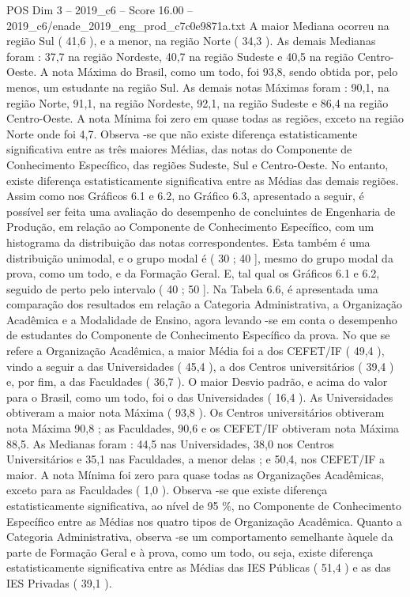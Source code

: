 \begin{textsample}{POS Dim 3 – 2019\_c6 – Score 16.00 – 2019\_c6/enade\_2019\_eng\_prod\_c7c0e9871a.txt}
A maior Mediana ocorreu na região Sul ( 41,6 ), e a menor, na região Norte ( 34,3 ).
As demais Medianas foram : 37,7 na região Nordeste, 40,7 na região Sudeste e 40,5 na região Centro-Oeste.
A nota Máxima do Brasil, como um todo, foi 93,8, sendo obtida por, pelo menos, um estudante na região Sul.
As demais notas Máximas foram : 90,1, na região Norte, 91,1, na região Nordeste, 92,1, na região Sudeste e 86,4 na região Centro-Oeste.
A nota Mínima foi zero em quase todas as regiões, exceto na região Norte onde foi 4,7.
Observa -se que não existe diferença estatisticamente significativa entre as três maiores Médias, das notas do Componente de Conhecimento Específico, das regiões Sudeste, Sul e Centro-Oeste.
No entanto, existe diferença estatisticamente significativa entre as Médias das demais regiões.
Assim como nos Gráficos 6.1 e 6.2, no Gráfico 6.3, apresentado a seguir, é possível ser feita uma avaliação do desempenho de concluintes de Engenharia de Produção, em relação ao Componente de Conhecimento Específico, com um histograma da distribuição das notas correspondentes.
Esta também é uma distribuição unimodal, e o grupo modal é ( 30 ; 40 ], mesmo do grupo modal da prova, como um todo, e da Formação Geral.
E, tal qual os Gráficos 6.1 e 6.2, seguido de perto pelo intervalo ( 40 ; 50 ].
Na Tabela 6.6, é apresentada uma comparação dos resultados em relação a Categoria Administrativa, a Organização Acadêmica e a Modalidade de Ensino, agora levando -se em conta o desempenho de estudantes do Componente de Conhecimento Específico da prova.
No que se refere a Organização Acadêmica, a maior Média foi a dos CEFET/IF ( 49,4 ), vindo a seguir a das Universidades ( 45,4 ), a dos Centros universitários ( 39,4 ) e, por fim, a das Faculdades ( 36,7 ).
O maior Desvio padrão, e acima do valor para o Brasil, como um todo, foi o das Universidades ( 16,4 ).
As Universidades obtiveram a maior nota Máxima ( 93,8 ).
Os Centros universitários obtiveram nota Máxima 90,8 ; as Faculdades, 90,6 e os CEFET/IF obtiveram nota Máxima 88,5.
As Medianas foram : 44,5 nas Universidades, 38,0 nos Centros Universitários e 35,1 nas Faculdades, a menor delas ; e 50,4, nos CEFET/IF a maior.
A nota Mínima foi zero para quase todas as Organizações Acadêmicas, exceto para as Faculdades ( 1,0 ).
Observa -se que existe diferença estatisticamente significativa, ao nível de 95 \%, no Componente de Conhecimento Específico entre as Médias nos quatro tipos de Organização Acadêmica.
Quanto a Categoria Administrativa, observa -se um comportamento semelhante àquele da parte de Formação Geral e à prova, como um todo, ou seja, existe diferença estatisticamente significativa entre as Médias das IES Públicas ( 51,4 ) e as das IES Privadas ( 39,1 ).

\end{textsample}
